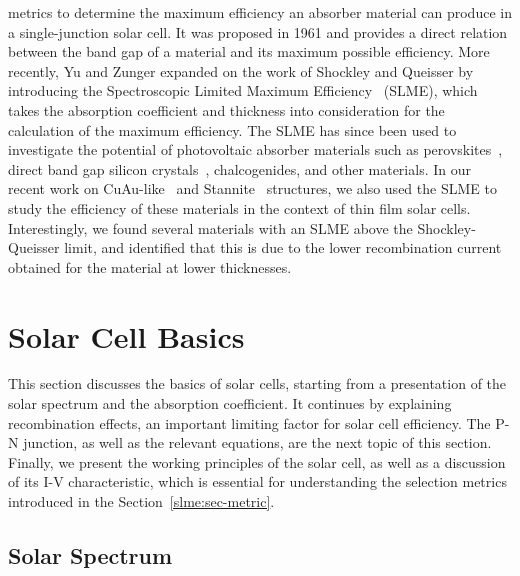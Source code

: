 \begin{refsection}
 
% 
metrics to determine the maximum efficiency an absorber material can produce 
in a single-junction solar cell. It was proposed in 1961 and provides a direct 
relation between the band gap of a material and its maximum possible 
efficiency. More recently, Yu and Zunger expanded on the work of Shockley and 
Queisser by introducing the Spectroscopic Limited Maximum 
Efficiency~\cite{Yu2012} (SLME), which takes the absorption coefficient and 
thickness into consideration for the calculation of the maximum efficiency. 
The SLME has since been used to investigate the potential of photovoltaic 
absorber materials such as perovskites~\cite{Meng2016}, direct band gap 
silicon crystals~\cite{Lee2014}, chalcogenides, and other materials. In our 
recent work on CuAu-like~\cite{Bercx2016} and Stannite~\cite{Sarmadian2016} 
structures, we also used the SLME to study the efficiency of these materials 
in the context of thin film solar cells. Interestingly, we found several 
materials with an SLME above the Shockley-Queisser limit, and identified that 
this is due to the lower recombination current obtained for the material at 
lower thicknesses. 
 
 
\section{Solar Cell Basics} \label{slme:sec-basics} 
 
This section discusses the basics of solar cells, starting from a presentation 
of the solar spectrum and the absorption coefficient. It continues by 
explaining recombination effects, an important limiting factor for solar cell 
efficiency. The P-N junction, as well as the relevant equations, are the next 
topic of this section. Finally, we present the working principles of the solar 
cell, as well as a discussion of its I-V characteristic, which is essential 
for understanding the selection metrics introduced in the 
Section~\ref{slme:sec-metric}. 
 
\subsection{Solar Spectrum} 
 

\end{refsection}
